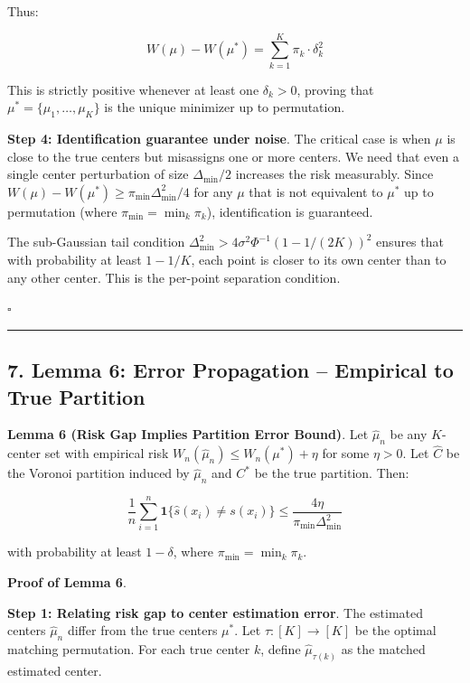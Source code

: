 \documentclass[
  12pt,
]{article}
\begin{document}
Thus:

\[W(\mu) - W(\mu^*) = \sum_{k=1}^K \pi_k \cdot \delta_k^2\]

This is strictly positive whenever at least one \(\delta_k > 0\),
proving that \(\mu^* = \{\mu_1,\dots,\mu_K\}\) is the unique minimizer
up to permutation.

\textbf{Step 4: Identification guarantee under noise}. The critical case
is when \(\mu\) is close to the true centers but misassigns one or more
centers. We need that even a single center perturbation of size
\(\Delta_{\min}/2\) increases the risk measurably. Since
\(W(\mu) - W(\mu^*) \geq \pi_{\min} \Delta_{\min}^2 / 4\) for any
\(\mu\) that is not equivalent to \(\mu^*\) up to permutation (where
\(\pi_{\min} = \min_k \pi_k\)), identification is guaranteed.

The sub-Gaussian tail condition
\(\Delta_{\min}^2 > 4\sigma^2 \Phi^{-1}(1 - 1/(2K))^2\) ensures that
with probability at least \(1 - 1/K\), each point is closer to its own
center than to any other center. This is the per-point separation
condition.

\(\square\)

\begin{center}\rule{0.5\linewidth}{0.5pt}\end{center}

\subsection{7. Lemma 6: Error Propagation -- Empirical to True
Partition}\label{lemma-6-error-propagation-empirical-to-true-partition}

\textbf{Lemma 6 (Risk Gap Implies Partition Error Bound)}. Let
\(\hat{\mu}_n\) be any \(K\)-center set with empirical risk
\(W_n(\hat{\mu}_n) \leq W_n(\mu^*) + \eta\) for some \(\eta > 0\). Let
\(\hat{C}\) be the Voronoi partition induced by \(\hat{\mu}_n\) and
\(C^*\) be the true partition. Then:

\[\frac{1}{n} \sum_{i=1}^n \mathbf{1}\{\hat{s}(x_i) \neq s(x_i)\} \leq \frac{4\eta}{\pi_{\min} \Delta_{\min}^2}\]

with probability at least \(1 - \delta\), where
\(\pi_{\min} = \min_k \pi_k\).

\textbf{Proof of Lemma 6}.

\textbf{Step 1: Relating risk gap to center estimation error}. The
estimated centers \(\hat{\mu}_n\) differ from the true centers
\(\mu^*\). Let \(\tau: [K] \to [K]\) be the optimal matching
permutation. For each true center \(k\), define \(\hat{\mu}_{\tau(k)}\)
as the matched estimated center.
\end{document}
